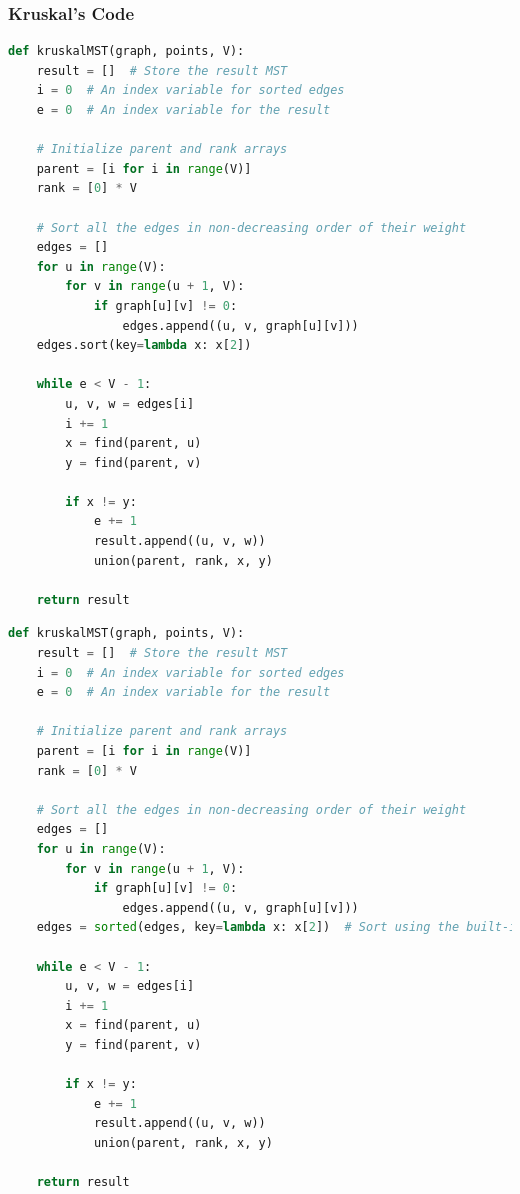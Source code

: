 \documentclass[a4paper, 10pt, twocolumn]{article}
\begin{document}
\subsubsection{Kruskal's Code}
\begin{lstlisting}[language=Python, caption={Python code for Naive Kruskal Algorithm using Insertion Sort}]
def kruskalMST(graph, points, V):
    result = []  # Store the result MST
    i = 0  # An index variable for sorted edges
    e = 0  # An index variable for the result

    # Initialize parent and rank arrays
    parent = [i for i in range(V)]
    rank = [0] * V

    # Sort all the edges in non-decreasing order of their weight
    edges = []
    for u in range(V):
        for v in range(u + 1, V):
            if graph[u][v] != 0:
                edges.append((u, v, graph[u][v]))
    edges.sort(key=lambda x: x[2])

    while e < V - 1:
        u, v, w = edges[i]
        i += 1
        x = find(parent, u)
        y = find(parent, v)

        if x != y:
            e += 1
            result.append((u, v, w))
            union(parent, rank, x, y)

    return result
\end{lstlisting}
\begin{lstlisting}[language=Python, caption={Python code for Efficient Kruskal Algorithm using Merge Sort}]
def kruskalMST(graph, points, V):
    result = []  # Store the result MST
    i = 0  # An index variable for sorted edges
    e = 0  # An index variable for the result

    # Initialize parent and rank arrays
    parent = [i for i in range(V)]
    rank = [0] * V

    # Sort all the edges in non-decreasing order of their weight
    edges = []
    for u in range(V):
        for v in range(u + 1, V):
            if graph[u][v] != 0:
                edges.append((u, v, graph[u][v]))
    edges = sorted(edges, key=lambda x: x[2])  # Sort using the built-in sorted() function

    while e < V - 1:
        u, v, w = edges[i]
        i += 1
        x = find(parent, u)
        y = find(parent, v)

        if x != y:
            e += 1
            result.append((u, v, w))
            union(parent, rank, x, y)

    return result
    
\end{lstlisting}
\newpage
\end{document}
